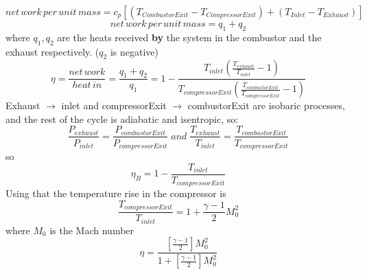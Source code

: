 \documentclass[fullpage]{article}
\begin{document}
\begin{equation}
net\, work\, per\, unit\, mass = c_p [(T_{CombustorExit}-T_{CompressorExit}) + (T_{Inlet}-T_{Exhaust})]
\end{equation}
\begin{equation}
net\,work\,per\,unit\,mass = q_1 + q_2
\end{equation}
where $q_1,q_2$ are the heats received \textbf{by} the system in the combustor and the exhaust respectively. ($q_2$ is negative)
\begin{equation}
\eta = \frac{net\,work}{heat\,in} = \frac{q_1 + q_2}{q_1} = 1-\frac{T_{inlet}(\frac{T_{exhaust}}{T_{inlet}}-1)}{T_{compressorExit}(\frac{T_{combustorExit}}{T_{compressorExit}}-1)}
\end{equation}
Exhaust $\rightarrow$ inlet and compressorExit $\rightarrow$ combustorExit are isobaric processes, and the rest of the cycle is adiabatic and isentropic, so:
\begin{equation}
\frac{P_{exhaust}}{P_{inlet}} = \frac{P_{combustorExit}}{P_{compressorExit}}\;and\; \frac{T_{exhaust}}{T_{inlet}} = \frac{T_{combustorExit}}{T_{compressorExit}}
\end{equation}
so
\begin{equation}
\eta_B = 1 - \frac{T_{inlet}}{T_{compressorExit}}
\end{equation}
Using that the temperature rise in the compressor is
\begin{equation}
\frac{T_{compressorExit}}{T_{inlet}} = 1 + \frac{\gamma -1}{2}M_0^2
\end{equation}
where $M_0$ is the Mach number
\begin{equation}
\eta = \frac{[\frac{\gamma -1}{2}]M_0^2}{1+[\frac{\gamma -1}{2}]M_0^2}
\end{equation}
\end{document}
